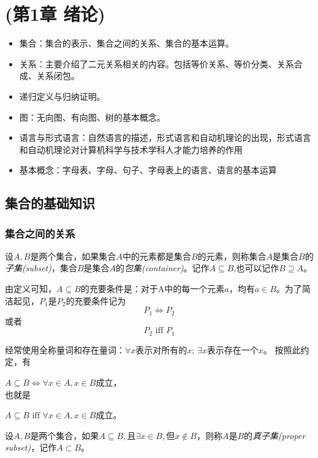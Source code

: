\chapter{\cite{蒋宗礼2013}(第1章 绪论)}

\begin{itemize}
	\item 集合：集合的表示、集合之间的关系、集合的基本运算。
	\item 关系：主要介绍了二元关系相关的内容。包括等价关系、等价分类、关系合成、关系闭包。
	\item 递归定义与归纳证明。	
	\item 图：无向图、有向图、树的基本概念。
	\item 语言与形式语言：自然语言的描述，形式语言和自动机理论的出现，形式语言和自动机理论对计算机科学与技术学科人才能力培养的作用
	\item 基本概念：字母表、字母、句子、字母表上的语言、语言的基本运算
	
\end{itemize}

\section{集合的基础知识}
\subsection{集合之间的关系}
\begin{definition}
	设$A,B$是两个集合，如果集合$A$中的元素都是集合$B$的元素，则称集合$A$是集合$B$的\emph{子集(subset)}，集合$B$是集合$A$的\emph{包集(container)}。记作$A\subseteq B$,也可以记作$B\supseteq A$。
\end{definition}

由定义可知，$A\subseteq B$的充要条件是：对于A中的每一个元素$a$，均有$a\in B$。为了简洁起见，$P_1$是$P_2$的充要条件记为
$$P_1\iff P_2$$
或者
$$P_2\text{ iff }P_1$$

经常使用全称量词和存在量词：$\forall x$表示对所有的$x$; $\exists x$表示存在一个$x$。
按照此约定，有

$A\subseteq B\iff\forall x\in A,x\in B$成立，\\
也就是

$A\subseteq B\text{ iff }\forall x\in A,x\in B$成立。

\begin{definition}
	设$A,B$是两个集合，如果$A\subseteq B,\text{且}\exists x\in B,\text{但}x\notin B$，则称$A$是$B$的\emph{真子集(proper subset)}，记作$A\subset B$。
\end{definition}

